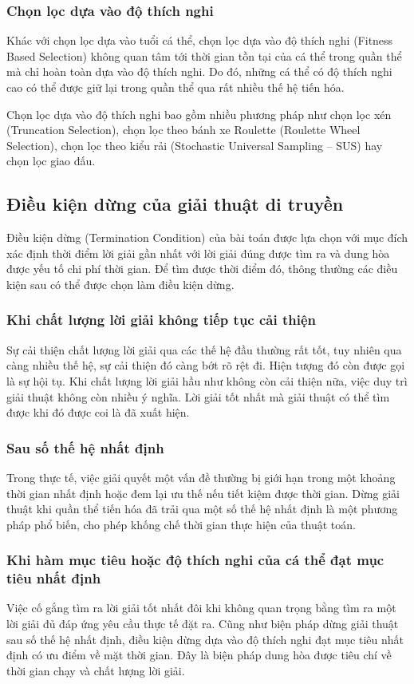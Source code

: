 \subsubsection{Chọn lọc dựa vào độ thích nghi}
Khác với chọn lọc dựa vào tuổi cá thể, chọn lọc dựa vào độ thích nghi (Fitness Based Selection) không quan tâm tới thời gian tồn tại của cá thể trong quần thể mà chỉ hoàn toàn dựa vào độ thích nghi. Do đó, những cá thể có độ thích nghi cao có thể được giữ lại trong quần thể qua rất nhiều thế hệ tiến hóa.

Chọn lọc dựa vào độ thích nghi bao gồm nhiều phương pháp như chọn lọc xén (Truncation Selection), chọn lọc theo bánh xe Roulette (Roulette Wheel Selection), chọn lọc theo kiểu rải (Stochastic Universal Sampling – SUS) hay chọn lọc giao đấu.

\subsection{Điều kiện dừng của giải thuật di truyền} \label{chap_coso:sec_ga:subsec:dkdung} 
Điều kiện dừng  (Termination Condition) của bài toán được lựa chọn với mục đích xác định thời điểm lời giải gần nhất với lời giải đúng được tìm ra và dung hòa được yếu tố chi phí thời gian. Để tìm được thời điểm đó, thông thường các điều kiện sau có thể được chọn làm điều kiện dừng.

\subsubsection{Khi chất lượng lời giải không tiếp tục cải thiện}
Sự cải thiện chất lượng lời giải qua các thế hệ đầu thường rất tốt, tuy nhiên qua càng nhiều thế hệ, sự cải thiện đó càng bớt rõ rệt đi. Hiện tượng đó còn được gọi là sự hội tụ.
Khi chất lượng lời giải hầu như không còn cải thiện nữa, việc duy trì giải thuật không còn nhiều ý nghĩa. Lời giải tốt nhất mà giải thuật có thể tìm được khi đó được coi là đã xuất hiện.

\subsubsection{Sau số thế hệ nhất định}
Trong thực tế, việc giải quyết một vấn đề thường bị giới hạn trong một khoảng thời gian nhất định hoặc đem lại ưu thế nếu tiết kiệm được thời gian. Dừng giải thuật khi quần thể tiến hóa đã trải qua một số thế hệ nhất định là một phương pháp phổ biến, cho phép khống chế thời gian thực hiện của thuật toán.

\subsubsection{Khi hàm mục tiêu hoặc độ thích nghi của cá thể đạt mục tiêu nhất định}
Việc cố gắng tìm ra lời giải tốt nhất đôi khi không quan trọng bằng tìm ra một lời giải đủ đáp ứng yêu cầu thực tế đặt ra. Cũng như biện pháp dừng giải thuật sau số thế hệ nhất định, điều kiện dừng dựa vào độ thích nghi đạt mục tiêu nhất định có ưu điểm về mặt thời gian. Đây là biện pháp dung hòa được tiêu chí về thời gian chạy và chất lượng lời giải.


